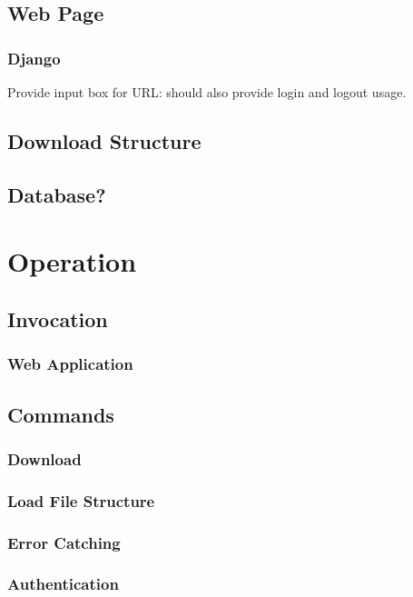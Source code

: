 \documentclass{article}
\begin{document}
        \subsection{Web Page}
            \subsubsection{Django}
            Provide input box for URL: should also provide login and logout usage.

        \subsection{Download Structure}

        \subsection{Database?}

    \section{Operation}
        \subsection{Invocation}
            \subsubsection{Web Application}

        \subsection{Commands}
            \subsubsection{Download}
            
            \subsubsection{Load File Structure}

            \subsubsection{Error Catching}

            \subsubsection{Authentication}
\end{document}
